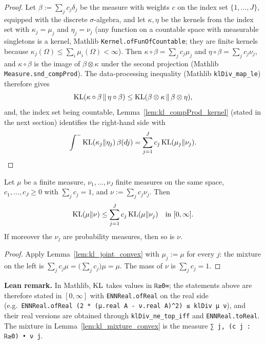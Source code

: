 \begin{proof}
\leanok
{}
Let $\beta := \sum_j c_j\delta_j$ be the measure with weights $c$ on the index set
$\{1,\dots,J\}$, equipped with the discrete $\sigma$-algebra, and let $\kappa,\eta$ be the kernels
from the index set with $\kappa_j = \mu_j$ and $\eta_j = \nu_j$ (any function on a countable space
with measurable singletons is a kernel, Mathlib \texttt{Kernel.ofFunOfCountable}; they are finite
kernels because $\kappa_j(\Omega) \le \sum_i \mu_i(\Omega) < \infty$). Then
$\kappa\circ\beta = \sum_j c_j\mu_j$ and $\eta\circ\beta = \sum_j c_j\nu_j$, and $\kappa\circ\beta$
is the image of $\beta\otimes\kappa$ under the second projection (Mathlib
\texttt{Measure.snd\_compProd}). The data-processing inequality (Mathlib \texttt{klDiv\_map\_le})
therefore gives
\[
  \mathrm{KL}(\kappa\circ\beta \,\|\, \eta\circ\beta) \le \mathrm{KL}(\beta\otimes\kappa \,\|\, \beta\otimes\eta) ,
\]
and, the index set being countable, Lemma~\ref{lem:kl_compProd_kernel} (stated in the next
section) identifies the right-hand side with
\[
  \int^{-} \mathrm{KL}(\kappa_j\|\eta_j)\,\beta(dj) = \sum_{j=1}^J c_j\,\mathrm{KL}(\mu_j\|\nu_j) .
\]
\end{proof}

\begin{lemma}\label{lem:kl_mixture_convex}
\leanok
Let $\mu$ be a finite measure, $\nu_1,\dots,\nu_J$ finite measures on the same space,
$c_1,\dots,c_J \ge 0$ with $\sum_j c_j = 1$, and $\nu := \sum_j c_j\nu_j$. Then
\[
  \mathrm{KL}(\mu\|\nu) \le \sum_{j=1}^J c_j\,\mathrm{KL}(\mu\|\nu_j) \quad\text{in } [0,\infty].
\]
If moreover the $\nu_j$ are probability measures, then so is $\nu$.
\end{lemma}

\begin{proof}
\leanok
{}
Apply Lemma~\ref{lem:kl_joint_convex} with $\mu_j := \mu$ for every $j$: the mixture on the left
is $\sum_j c_j\mu = \big(\sum_j c_j\big)\mu = \mu$. The mass of $\nu$ is $\sum_j c_j = 1$.
\end{proof}

\textbf{Lean remark.} In Mathlib, $\mathrm{KL}$ takes values in \texttt{ℝ≥0∞}; the statements above
are therefore stated in $[0,\infty]$ with \texttt{ENNReal.ofReal} on the real side (e.g.\
\texttt{ENNReal.ofReal (2 * (μ.real A - ν.real A)\^{}2) ≤ klDiv μ ν}), and their real versions are
obtained through \texttt{klDiv\_ne\_top\_iff} and \texttt{ENNReal.toReal}. The mixture in
Lemma~\ref{lem:kl_mixture_convex} is the measure \texttt{∑ j, (c j : ℝ≥0) • ν j}.

